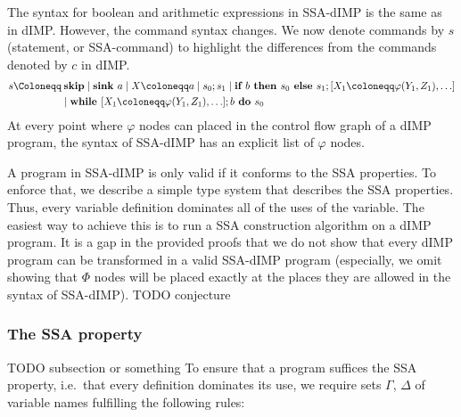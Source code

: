 The syntax for boolean and arithmetic expressions in SSA-dIMP is the same as in dIMP.
However, the command syntax changes.
We now denote commands by $s$ (statement, or SSA-command) to highlight the differences
from the commands denoted by $c$ in dIMP.
\begin{align*}
    s \Coloneqq &\:\skipcmd \mid \defaultsink \mid \defaultstore \mid \defaultssaseq 
    \mid \defaultssaif\\
    &\mid \defaultssawhile%
\end{align*}
At every point where $\varphi$ nodes can placed in the control flow graph
of a dIMP program, the syntax of SSA-dIMP has an explicit list of $\varphi$ nodes.

A program in SSA-dIMP is only valid if it conforms to the SSA properties.
To enforce that, we describe a simple type system that describes the SSA properties.
Thus, every variable definition dominates all of the uses of the variable.
The easiest way to achieve this is to run a SSA construction algorithm on a dIMP program.
It is a gap in the provided proofs that we do not show that every dIMP program
can be transformed in a valid SSA-dIMP program (especially, we omit showing that
$\Phi$ nodes will be placed exactly at the places they are allowed in the syntax
of SSA-dIMP).
TODO conjecture

\subsubsection*{The SSA property}
TODO subsection or something
To ensure that a program suffices the SSA property, i.e.\ that every definition dominates its use,
we require sets $\Gamma$, $\Delta$ of variable names fulfilling the following rules:

